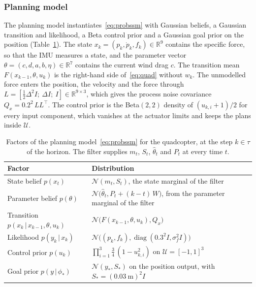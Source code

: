\documentclass{l4dc2027}
\def\cN{\mathcal{N}}
\def\cU{\mathcal{U}}
\newcommand\given[1][]{\,#1\vert\,}
\begin{document}
\subsubsection{Planning model}\label{supp:quad-model}

The planning model instantiates~\eqref{eq:probssm} with Gaussian beliefs, a Gaussian transition and likelihood, a Beta control prior and a Gaussian goal prior on the position (Table~\ref{tab:quad-model}). The state $x_k = (p_k, \dot p_k, f_k) \in \mathbb{R}^9$ contains the specific force, so that the IMU measures a state, and the parameter vector $\theta = (c, d, a, b, \eta) \in \mathbb{R}^7$ contains the current wind drag $c$. The transition mean $F(x_{k-1}, \theta, u_k)$ is the right-hand side of~\eqref{eq:quad} without $w_k$. The unmodelled force enters the position, the velocity and the force through $L = [\tfrac{1}{2}\Delta^2 I;\ \Delta I;\ I] \in \mathbb{R}^{9 \times 3}$, which gives the process noise covariance $Q_x = 0.2^2\, L L^\top$. The control prior is the Beta$(2,2)$ density of $(u_{k,i} + 1)/2$ for every input component, which vanishes at the actuator limits and keeps the plans inside $\cU$.

\begin{table}[htb]
	\centering
	\caption{Factors of the planning model~\eqref{eq:probssm} for the quadcopter, at the step $k \in \tau$ of the horizon. The filter supplies $m_t$, $S_t$, $\hat\theta_t$ and $P_t$ at every time $t$.}
	\label{tab:quad-model}
	\begin{tabular}{@{}ll@{}}
		\toprule
		Factor & Distribution \\
		\midrule
		State belief $p(x_t)$ & $\cN(m_t, S_t)$, the state marginal of the filter \\
		Parameter belief $p(\theta)$ & $\cN\big(\hat\theta_t, P_t + (k - t)\, W\big)$, from the parameter marginal of the filter \\
		Transition $p(x_k \given x_{k-1}, \theta, u_k)$ & $\cN\big(F(x_{k-1}, \theta, u_k), Q_x\big)$ \\
		Likelihood $p(y_k \given x_k)$ & $\cN\big((p_k, f_k), \operatorname{diag}(0.3^2 I, \sigma_f^2 I)\big)$ \\
		Control prior $p(u_k)$ & $\prod_{i=1}^{3} \tfrac{3}{4}\,(1 - u_{k,i}^2)$ on $\cU = [-1, 1]^3$ \\
		Goal prior $p(y \given \phi_*)$ & $\cN(y_*, S_*)$ on the position output, with $S_* = (0.03~\mathrm{m})^2 I$ \\
		\bottomrule
	\end{tabular}
\end{table}
\end{document}
